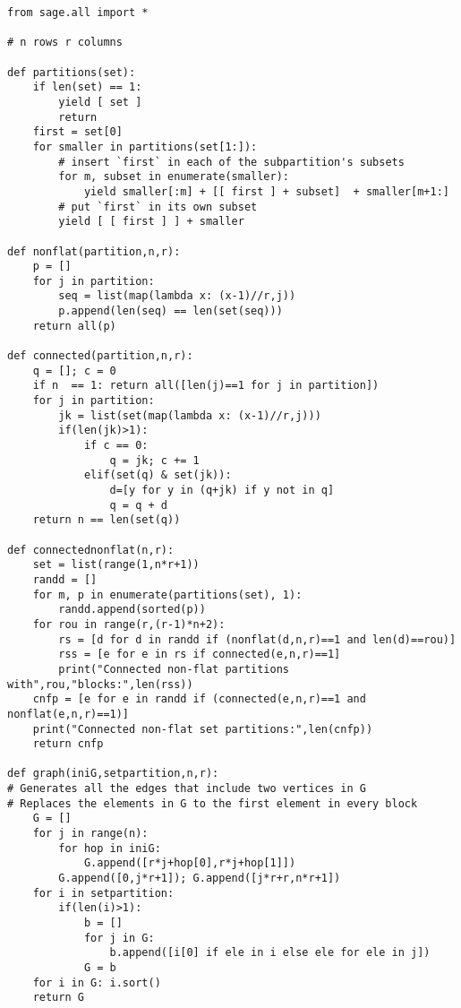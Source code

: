 \documentclass[12pt]{article}
\numberwithin{equation}{section}
\begin{document}
\begin{lstlisting}
from sage.all import *

# n rows r columns

def partitions(set):
    if len(set) == 1:
        yield [ set ]
        return
    first = set[0]
    for smaller in partitions(set[1:]):
        # insert `first` in each of the subpartition's subsets
        for m, subset in enumerate(smaller):
            yield smaller[:m] + [[ first ] + subset]  + smaller[m+1:]
        # put `first` in its own subset
        yield [ [ first ] ] + smaller

def nonflat(partition,n,r):
    p = []
    for j in partition:    
        seq = list(map(lambda x: (x-1)//r,j))
        p.append(len(seq) == len(set(seq)))
    return all(p)

def connected(partition,n,r):
    q = []; c = 0
    if n  == 1: return all([len(j)==1 for j in partition])
    for j in partition:
        jk = list(set(map(lambda x: (x-1)//r,j)))
        if(len(jk)>1):            
            if c == 0:
                q = jk; c += 1
            elif(set(q) & set(jk)):
                d=[y for y in (q+jk) if y not in q]
                q = q + d
    return n == len(set(q))

def connectednonflat(n,r):
    set = list(range(1,n*r+1))
    randd = []
    for m, p in enumerate(partitions(set), 1):
        randd.append(sorted(p))
    for rou in range(r,(r-1)*n+2):    
        rs = [d for d in randd if (nonflat(d,n,r)==1 and len(d)==rou)]
        rss = [e for e in rs if connected(e,n,r)==1]
        print("Connected non-flat partitions with",rou,"blocks:",len(rss))
    cnfp = [e for e in randd if (connected(e,n,r)==1 and nonflat(e,n,r)==1)]
    print("Connected non-flat set partitions:",len(cnfp))
    return cnfp

def graph(iniG,setpartition,n,r):
# Generates all the edges that include two vertices in G
# Replaces the elements in G to the first element in every block
    G = []
    for j in range(n):
        for hop in iniG:
            G.append([r*j+hop[0],r*j+hop[1]])
        G.append([0,j*r+1]); G.append([j*r+r,n*r+1])
    for i in setpartition:
        if(len(i)>1):
            b = []
            for j in G:
                b.append([i[0] if ele in i else ele for ele in j])
            G = b
    for i in G: i.sort()
    return G


\end{lstlisting}
\end{document}
